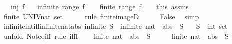 \begin{isabellebody}
\ \ \ {\isachardoublequoteopen}inj\ f{\isachardoublequoteclose}\isanewline
\ \ \ {\isachardoublequoteopen}infinite\ {\isacharparenleft}range\ f{\isacharparenright}{\isachardoublequoteclose}\isanewline
%
\isadelimproof
%
\endisadelimproof
%
\isatagproof
{}\isamarkupfalse%
\isanewline
\ \ \isamarkupfalse%
\ {\isachardoublequoteopen}finite\ {\isacharparenleft}range\ f{\isacharparenright}{\isachardoublequoteclose}\isanewline
\ \ \isamarkupfalse%
\ this\ assms\ \isamarkupfalse%
\ {\isachardoublequoteopen}finite\ {\isacharparenleft}UNIV{\isacharcolon}{\isacharcolon}nat\ set{\isacharparenright}{\isachardoublequoteclose}\isanewline
\ \ \ \ \isamarkupfalse%
\ {\isacharparenleft}rule\ finite{\isacharunderscore}imageD{\isacharparenright}\isanewline
\ \ \isamarkupfalse%
\ \isamarkupfalse%
\ False\ \isamarkupfalse%
\ simp\isanewline
{}\isamarkupfalse%
%
\endisatagproof
{\isafoldproof}%
%
\isadelimproof
%
\endisadelimproof
%
\isadelimdocument
%
\endisadelimdocument
%
\isatagdocument
%
\isamarkuptrue%
%
\endisatagdocument
{\isafolddocument}%
%
\isadelimdocument
%
\endisadelimdocument
{}\isamarkupfalse%
\ infinite{\isacharunderscore}int{\isacharunderscore}iff{\isacharunderscore}infinite{\isacharunderscore}nat{\isacharunderscore}abs{\isacharcolon}\ {\isachardoublequoteopen}infinite\ S\ {\isasymlongleftrightarrow}\ infinite\ {\isacharparenleft}{\isacharparenleft}nat\ {\isasymcirc}\ abs{\isacharparenright}\ {\isacharbackquote}\ S{\isacharparenright}{\isachardoublequoteclose}\isanewline
\ \ \ S\ {\isacharcolon}{\isacharcolon}\ {\isachardoublequoteopen}int\ set{\isachardoublequoteclose}\isanewline
%
\isadelimproof
%
\endisadelimproof
%
\isatagproof
{}\isamarkupfalse%
\ {\isacharparenleft}unfold\ Not{\isacharunderscore}eq{\isacharunderscore}iff{\isacharcomma}\ rule\ iffI{\isacharparenright}\isanewline
\ \ \isamarkupfalse%
\ {\isachardoublequoteopen}finite\ {\isacharparenleft}{\isacharparenleft}nat\ {\isasymcirc}\ abs{\isacharparenright}\ {\isacharbackquote}\ S{\isacharparenright}{\isachardoublequoteclose}\isanewline
\ \ \isamarkupfalse%
\ \isamarkupfalse%
\ {\isachardoublequoteopen}finite\ {\isacharparenleft}nat\ {\isacharbackquote}\ {\isacharparenleft}abs\ {\isacharbackquote}\ S{\isacharparenright}{\isacharparenright}{\isachardoublequoteclose}\isanewline

\end{isabellebody}
